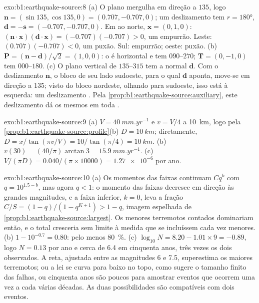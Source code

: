 \begin{solution}{exo:b1:earthquake-source:8}
(a) O plano mergulha em direção a $135$, logo $\mathbf n = (\sin135, \cos135, 0) =
(0.707, -0.707, 0)$; um deslizamento  tem $r = \ang{180}$, $\mathbf d = -\mathbf s
= (-0.707, -0.707, 0)$. Em  ao norte, $\mathbf x = (0, 1, 0)$:
$(\mathbf n\cdot\mathbf x)(\mathbf d\cdot\mathbf x) = (-0.707)(-0.707) > 0$, um
empurrão. Leste: $(0.707)(-0.707) < 0$, um puxão. Sul: empurrão; oeste: puxão.
(b) $\mathbf P = (\mathbf n - \mathbf d)/\sqrt2 = (1, 0, 0)$: o  é
horizontal e tem  $090$--$270$; $\mathbf T = (0, -1, 0)$ tem 
$000$--$180$. (c) O plano vertical de  $135$--$315$ tem a normal
$\mathbf d$.
Com o deslizamento $\mathbf n$, o bloco de seu lado sudoeste, para o qual $\mathbf d$ aponta, move-se em direção a $135$; visto do bloco nordeste, olhando para sudoeste, isso está à esquerda: um deslizamento . Pela \cref{prop:b1:earthquake-source:auxiliary}, este deslizamento dá os mesmos  em toda .
\end{solution}

\begin{solution}{exo:b1:earthquake-source:9}
(a) $V = \qty{40}{mm.yr^{-1}}$ e $v = V/4$ a \qty{10}{km}, logo pela
\cref{prop:b1:earthquake-source:profile}(b) $D = \qty{10}{km}$; diretamente,
$D = x/\tan(\pi v/V) = 10/\tan(\pi/4) = \qty{10}{km}$. (b) $v(30) =
(40/\pi)\arctan 3 = \qty{15.9}{mm.yr^{-1}}$. (c) $V/(\pi D) =
\num{0.040}/(\pi\times\num{10000}) = \num{1.27e-6}$ por ano.
\end{solution}

\begin{solution}{exo:b1:earthquake-source:10}
(a) Os momentos das faixas continuam $C q^k$ com $q = 10^{1.5 - b}$, mas agora $q < 1$: o momento das faixas decresce em direção às grandes magnitudes, e a faixa inferior, $k = 0$, leva a fração $C/S = (1 - q)/(1 - q^{K+1}) > 1 - q$, imagem espelhada de \cref{prop:b1:earthquake-source:largest}. Os menores terremotos contados dominariam então, e o total cresceria sem limite à medida que se incluíssem cada vez menores. (b) $1 - 10^{-0.7} = 0.80$: pelo menos \qty{80}{\percent}. (c) $\log_{10}N = 8.20 - 1.01\times9 = -0.89$, logo $N = 0.13$
por ano e cerca de 6.4 em cinquenta anos, três vezes os dois observados. A reta, ajustada entre as magnitudes 6 e 7.5, superestima os maiores terremotos; ou a lei se curva para baixo no topo, como sugere o tamanho finito das falhas, ou cinquenta anos são poucos para amostrar eventos que ocorrem uma vez a cada várias décadas. As duas possibilidades são compatíveis com dois eventos.
\end{solution}

